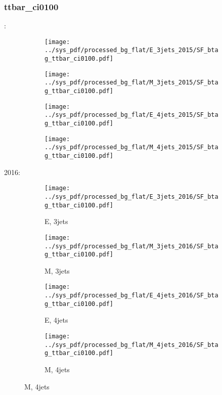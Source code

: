\documentclass{beamer}
\begin{document}
\begin{frame}
\frametitle{ttbar_ci0100}
\fontsize{5}{1}:
\begin{figure}
\centering
\begin{subfigure}[b]{0.24\textwidth}
\texttt{[image: ../sys\_pdf/processed\_bg\_flat/E\_3jets\_2015/SF\_btag\_ttbar\_ci0100.pdf]}
\end{subfigure}
\begin{subfigure}[b]{0.24\textwidth}
\texttt{[image: ../sys\_pdf/processed\_bg\_flat/M\_3jets\_2015/SF\_btag\_ttbar\_ci0100.pdf]}
\end{subfigure}
\begin{subfigure}[b]{0.24\textwidth}
\texttt{[image: ../sys\_pdf/processed\_bg\_flat/E\_4jets\_2015/SF\_btag\_ttbar\_ci0100.pdf]}
\end{subfigure}
\begin{subfigure}[b]{0.24\textwidth}
\texttt{[image: ../sys\_pdf/processed\_bg\_flat/M\_4jets\_2015/SF\_btag\_ttbar\_ci0100.pdf]}
\end{subfigure}
\end{figure}
2016:
\begin{figure}
\centering
\begin{subfigure}[b]{0.24\textwidth}
\texttt{[image: ../sys\_pdf/processed\_bg\_flat/E\_3jets\_2016/SF\_btag\_ttbar\_ci0100.pdf]}
\captionsetup{font=tiny}
\caption{E, 3jets}
\end{subfigure}
\begin{subfigure}[b]{0.24\textwidth}
\texttt{[image: ../sys\_pdf/processed\_bg\_flat/M\_3jets\_2016/SF\_btag\_ttbar\_ci0100.pdf]}
\captionsetup{font=tiny}
\caption{M, 3jets}
\end{subfigure}
\begin{subfigure}[b]{0.24\textwidth}
\texttt{[image: ../sys\_pdf/processed\_bg\_flat/E\_4jets\_2016/SF\_btag\_ttbar\_ci0100.pdf]}
\captionsetup{font=tiny}
\caption{E, 4jets}
\end{subfigure}
\begin{subfigure}[b]{0.24\textwidth}
\texttt{[image: ../sys\_pdf/processed\_bg\_flat/M\_4jets\_2016/SF\_btag\_ttbar\_ci0100.pdf]}
\captionsetup{font=tiny}
\caption{M, 4jets}
\end{subfigure}
\end{figure}
\end{frame}
\end{document}
